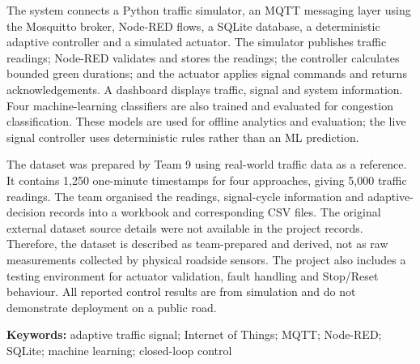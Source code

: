 \documentclass[12pt,a4paper,oneside]{report}
\begin{document}
The system connects a Python traffic simulator, an MQTT messaging layer using the Mosquitto broker, Node-RED flows, a SQLite database, a deterministic adaptive controller and a simulated actuator. The simulator publishes traffic readings; Node-RED validates and stores the readings; the controller calculates bounded green durations; and the actuator applies signal commands and returns acknowledgements. A dashboard displays traffic, signal and system information. Four machine-learning classifiers are also trained and evaluated for congestion classification. These models are used for offline analytics and evaluation; the live signal controller uses deterministic rules rather than an ML prediction.

The dataset was prepared by Team 9 using real-world traffic data as a reference. It contains 1,250 one-minute timestamps for four approaches, giving 5,000 traffic readings. The team organised the readings, signal-cycle information and adaptive-decision records into a workbook and corresponding CSV files. The original external dataset source details were not available in the project records. Therefore, the dataset is described as team-prepared and derived, not as raw measurements collected by physical roadside sensors. The project also includes a testing environment for actuator validation, fault handling and Stop/Reset behaviour. All reported control results are from simulation and do not demonstrate deployment on a public road.

\textbf{Keywords:} adaptive traffic signal; Internet of Things; MQTT; Node-RED; SQLite; machine learning; closed-loop control
\end{document}
